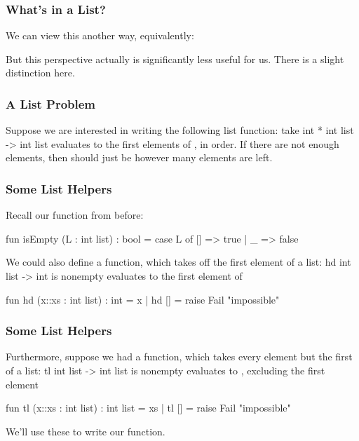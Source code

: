 \documentclass[aspectratio=169, handout]{beamer}
\begin{document}
\begin{frame}[fragile]
  \frametitle{What's in a List?}

  We can view this another way, equivalently:

  \pause
  \vspace{\fill}


  \pause
  \vspace{\fill}

  But this perspective actually is significantly less useful for
  us. There is a slight distinction here.
\end{frame}

\begin{frame}[fragile]
  \frametitle{A List Problem}

  Suppose we are interested in writing the following list function:
  \spec
    {take}
    {int * int list -> int list}
    {}
    { evaluates to the first  elements of ,
    in order. If there are not enough elements, then  should just be
    however many elements are left.}

\end{frame}

\begin{frame}[fragile]
  \frametitle{Some List Helpers}

  Recall our  function from before:
  \begin{codeblock}
    fun isEmpty (L : int list) : bool =
      case L of
        [] => true
      | _ => false
  \end{codeblock}

  \pause
  \vspace{\fill}

  We could also define a  function, which takes off the
  first element of a list:
  \spec
    {hd}
    {int list -> int}
    { is nonempty}
    { evaluates to the first element of }
  \pause
  \begin{codeblock}
    fun hd (x::xs : int list) : int = x
      | hd [] = raise Fail "impossible"
  \end{codeblock}

\end{frame}

\begin{frame}[fragile]
  \frametitle{Some List Helpers}

  Furthermore, suppose we had a  function, which takes
  every element but the first of a list:
  \spec
    {tl}
    {int list -> int list}
    { is nonempty}
    { evaluates to , excluding the first element}
  \pause
  \begin{codeblock}
    fun tl (x::xs : int list) : int list = xs
      | tl [] = raise Fail "impossible"
  \end{codeblock}

  \pause
  \vspace{\fill}

  We'll use these to write our  function.
\end{frame}
\end{document}
